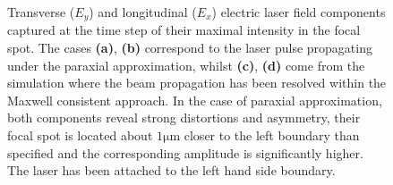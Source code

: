 \begin{figure}[h!]
	\hspace{2mm}
	\caption{Transverse ($ E_{y} $) and longitudinal ($ E_{x} $) electric laser field components captured at the time step of their maximal intensity in the focal spot. The cases \textbf{(a)}, \textbf{(b)} correspond to the laser pulse propagating under the paraxial approximation, whilst \textbf{(c)}, \textbf{(d)} come from the simulation where the beam propagation has been resolved within the Maxwell consistent approach. In the case of paraxial approximation, both components reveal strong distortions and asymmetry, their focal spot is located about $ \mathrm{1 \mu m} $ closer to the left boundary than specified and the corresponding amplitude is significantly higher. The laser has been attached to the left hand side boundary.}
	\label{fig:1}
\end{figure}

